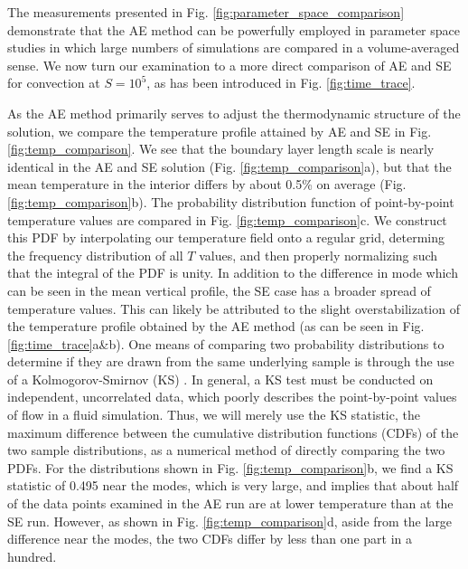 \documentclass[aps, pre, onecolumn, nofootinbib, notitlepage, groupedaddress, amsfonts, amssymb, amsmath, longbibliography]{revtex4-1}
\begin{document}
The measurements presented in Fig. \ref{fig:parameter_space_comparison} demonstrate
that the AE method can be powerfully employed in parameter space studies in which
large numbers of simulations are compared in a volume-averaged sense.  We now turn
our examination to a more direct comparison of AE and SE for convection at
$S = 10^5$, as has been introduced in Fig. \ref{fig:time_trace}.

As the AE method primarily serves to adjust the thermodynamic structure of the
solution, we compare the temperature profile attained by AE and SE in 
Fig. \ref{fig:temp_comparison}.  We see that the boundary layer length scale is 
nearly identical in the AE and SE solution (Fig. \ref{fig:temp_comparison}a), but that
the mean temperature in the interior differs by about 0.5\% on average
(Fig. \ref{fig:temp_comparison}b). The probability distribution function of point-by-point
temperature values are compared in Fig. \ref{fig:temp_comparison}c.  We construct
this PDF by interpolating our temperature field onto a regular grid, determing the
frequency distribution of all $T$ values, and then properly normalizing such that
the integral of the PDF is unity.  In addition to the
difference in mode which can be seen in the mean vertical profile, the SE case
has a broader spread of temperature values.  This can likely be attributed to the
slight overstabilization of the temperature profile obtained by the AE method
(as can be seen in Fig. \ref{fig:time_trace}a\&b).  One means of comparing two
probability distributions to determine if they are drawn from the same underlying
sample is through the use of a Kolmogorov-Smirnov (KS) \cite{wall&jenkins2012}.
In general, a KS test must be conducted on independent, uncorrelated data, which
poorly describes the point-by-point values of flow in a fluid simulation. Thus,
we will merely use the KS statistic, the maximum difference
between the cumulative distribution functions (CDFs) of the two sample distributions,
as a numerical method of directly comparing the two PDFs.  For the distributions
shown in Fig. \ref{fig:temp_comparison}b,
we find a KS statistic of 0.495 near the modes, which is very large, and implies that
about half of the data points examined in the AE run are at lower temperature than 
at the SE run. However, as shown in Fig. \ref{fig:temp_comparison}d, aside from the
large difference near the modes, the two CDFs differ by less than one part in a hundred.
\end{document}
